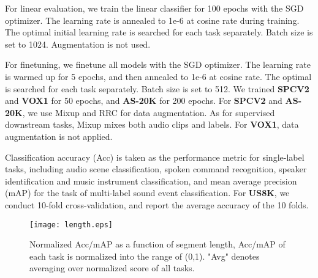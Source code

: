  For linear evaluation, we train the linear classifier for 100 epochs with the SGD optimizer. The learning rate is annealed to 1e-6 at cosine rate during training. The optimal initial learning rate is searched for each task separately. Batch size is set to 1024. Augmentation is not used. 
 
 For finetuning, we finetune all models with the SGD optimizer.  The learning rate  is warmed up for 5 epochs, and then annealed to 1e-6 at cosine rate. The optimal  is searched for each task separately. Batch size is set to 512. We trained \textbf{SPCV2} and \textbf{VOX1} for 50 epochs, and \textbf{AS-20K} for 200 epochs. For \textbf{SPCV2} and \textbf{AS-20K}, we use Mixup \cite{kong2020panns} and RRC for data augmentation. As for supervised downstream tasks, Mixup mixes both audio clips and labels. For \textbf{VOX1}, data augmentation is not applied. 


Classification accuracy (Acc) is taken as the performance metric for single-label tasks, including audio scene classification, spoken command recognition, speaker identification and music instrument classification, and mean average precision (mAP) for the task of multi-label sound event classification. For \textbf{US8K}, we conduct 10-fold cross-validation, and report the average accuracy of the 10 folds. 

\begin{figure}[t]
  \centering
  \texttt{[image: length.eps]}
\caption{Normalized Acc/mAP as a function of segment length, Acc/mAP of each task is normalized into the range of (0,1). "Avg" denotes averaging over normalized score of all tasks. }
  \label{fig:length}
\end{figure}

